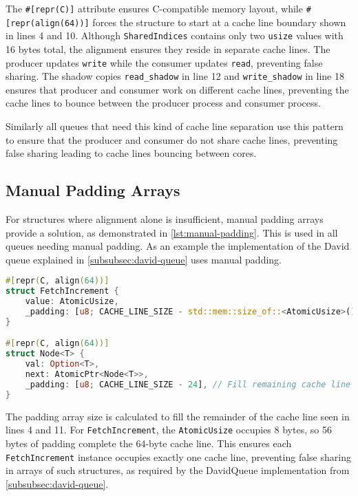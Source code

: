 The \texttt{\#[repr(C)]} attribute ensures C-compatible memory layout, while \newline \texttt{\#[repr(align(64))]} forces the structure to start at a cache line boundary shown in lines 4 and 10. Although \texttt{SharedIndices} contains only two \texttt{usize} values with 16 bytes total, the alignment ensures they reside in separate cache lines. The producer updates \texttt{write} while the consumer updates \texttt{read}, preventing false sharing. The shadow copies \texttt{read\_shadow} in line 12 and \texttt{write\_shadow} in line 18 ensures that producer and consumer work on different cache lines, preventing the cache lines to bounce between the producer process and consumer process.

Similarly all queues that need this kind of cache line separation use this pattern to ensure that the producer and consumer do not share cache lines, preventing false sharing leading to cache lines bouncing between cores.

\subsection{Manual Padding Arrays}

For structures where alignment alone is insufficient, manual padding arrays provide a solution, as demonstrated in \cref{lst:manual-padding}. This is used in all queues needing manual padding. As an example the implementation of the David queue explained in \cref{subsubsec:david-queue} uses manual padding.

\begin{lstlisting}[language=Rust, style=boxed, caption={Manual padding for exact cache line control}, label={lst:manual-padding}]
#[repr(C, align(64))]
struct FetchIncrement {
    value: AtomicUsize,
    _padding: [u8; CACHE_LINE_SIZE - std::mem::size_of::<AtomicUsize>()],
}

#[repr(C, align(64))]
struct Node<T> {
    val: Option<T>,
    next: AtomicPtr<Node<T>>,
    _padding: [u8; CACHE_LINE_SIZE - 24], // Fill remaining cache line
}
\end{lstlisting}

The padding array size is calculated to fill the remainder of the cache line seen in lines 4 and 11. For \texttt{FetchIncrement}, the \texttt{AtomicUsize} occupies 8 bytes, so 56 bytes of padding complete the 64-byte cache line. This ensures each \texttt{FetchIncrement} instance occupies exactly one cache line, preventing false sharing in arrays of such structures, as required by the DavidQueue implementation from \cref{subsubsec:david-queue}.


